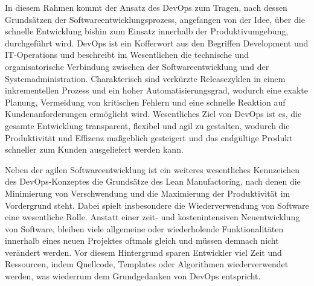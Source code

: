 In diesem Rahmen kommt der Ansatz des DevOps  zum Tragen, nach dessen Grundsätzen der Softwareentwicklungsprozess, angefangen von der Idee, über die schnelle Entwicklung  bishin zum Einsatz innerhalb der Produktivumgebung, durchgeführt wird.
DevOps ist ein Kofferwort  aus den Begriffen Development und IT-Operations und beschreibt im Wesentlichen die technische und organisatorische Verbindung zwischen der Softwareentwicklung und der Systemadministration.
Charakterisch sind verkürzte Releasezyklen in einem inkrementellen Prozess und ein hoher Automatisierungsgrad, wodurch eine exakte Planung, Vermeidung von kritischen Fehlern und eine schnelle Reaktion auf Kundenanforderungen ermöglicht wird.
Wesentliches Ziel von DevOps ist es, die gesamte Entwicklung transparent, flexibel und agil zu gestalten, wodurch die Produktivität und Effizenz maßgeblich gesteigert und das endgültige Produkt schneller zum Kunden ausgeliefert werden kann. 

Neben der agilen Softwareentwicklung ist ein weiteres wesentliches Kennzeichen des DevOps-Konzeptes die Grundsätze des Lean Manufactoring,  nach denen die Minimierung von Verschwendung und die Maximierung der Produktivität im Vordergrund steht.
Dabei spielt insbesondere die Wiederverwendung von Software eine wesentliche Rolle.
Anstatt einer zeit- und kostenintensiven Neuentwicklung von Software, bleiben viele allgemeine oder wiederholende Funktionalitäten innerhalb eines neuen Projektes oftmals gleich und müssen demnach nicht verändert werden.
Vor diesem Hintergrund sparen Entwickler viel Zeit und Ressourcen, indem Quellcode, Templates oder Algorithmen wiederverwendet werden, was wiederrum dem Grundgedanken von DevOps entspricht.

